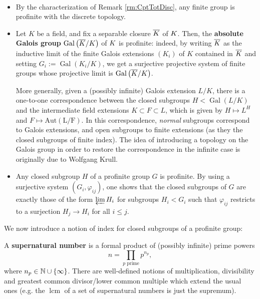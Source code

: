 \documentclass[a4paper, oneside]{memoir}
\begin{document}
\begin{example}\
	\begin{itemize}
		\item By the characterization of Remark \ref{rm:CptTotDisc}, any finite group is profinite with the discrete topology.
		\item Let $K$ be a field, and fix a separable closure $\overline{K}$ of $K$. Then, the \textbf{absolute Galois group} $\operatorname{Gal}\left( \overline{K}/K \right)$ of $K$ is profinite: indeed, by writing $\overline{K}$ as the inductive limit of the finite Galois extensions $(K_i)$ of $K$ contained in $\overline{K}$ and setting $G_i:=\operatorname{Gal}{(K_i/K)}$, we get a surjective projective system of finite groups whose projective limit is $\operatorname{Gal}\left( \overline{K}/K \right)$.

		      More generally, given a (possibly infinite) Galois extension $L/K$, there is a one-to-one correspondence between the closed subgroups $H<\operatorname{Gal}{(L/K)}$ and the intermediate field extensions $K\subset F\subset L$, which is given by $H\mapsto L^H$ and $F\mapsto \operatorname{Aut(L/F)}$.
		      In this correspondence, \textit{normal} subgroups correspond to Galois extensions, and open subgroups to finite extensions (as they  the closed subgroups of finite index). The idea of introducing a topology on the Galois group in order to restore the correspondence in the infinite case is originally due to Wolfgang Krull.

		\item Any closed subgroup $H$ of a profinite group $G$ is profinite. By using a surjective system $(G_i,\varphi_{ij})$, one shows that the closed subgroups of $G$ are exactly those of the form $\varprojlim H_i$ for subgroups $H_i<G_i$ such that $\varphi_{ij}$ restricts to a surjection $H_j\to H_i$ for all $i\leq j$.
	\end{itemize}
\end{example}

We now introduce a notion of index for closed subgroups of a profinite group:

\begin{definition}
	A \textbf{supernatural number} is a formal product of (possibly infinite) prime powers
	\[
		n=\prod_{p\text{ prime}}{p^{n_p}},
	\]
	where $n_p\in\mathbb{N}\cup\{\infty\}$. There are well-defined notions of multiplication, divisibility and greatest common divisor/lower common multiple which extend the usual ones (e.g. the $\operatorname{lcm}$ of a set of supernatural numbers is just the supremum).
\end{definition}
\end{document}

